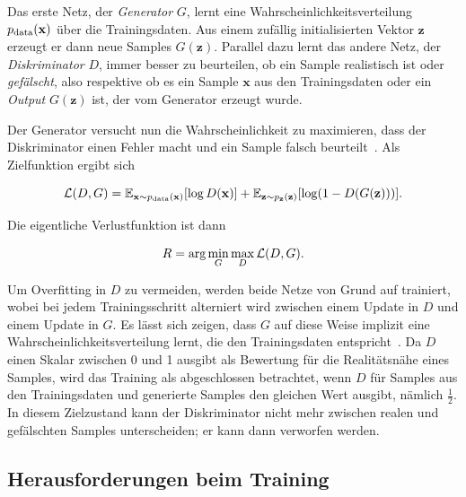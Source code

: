 Das erste Netz, der \emph{Generator} $ G $, lernt eine Wahrscheinlichkeitsverteilung $ p_{\textup{data}}(\mathbf{x}) $ über die Trainingsdaten.
Aus einem zufällig initialisierten Vektor $ \mathbf{z} $ erzeugt er dann neue Samples $ G(\mathbf{z}) $.
Parallel dazu lernt das andere Netz, der \emph{Diskriminator} $ D $, immer besser zu beurteilen, ob ein Sample realistisch ist oder \emph{gefälscht}, also respektive ob es ein Sample $ \mathbf{x} $ aus den Trainingsdaten oder ein \emph{Output} $ G(\mathbf{z}) $ ist, der vom Generator erzeugt wurde.

Der Generator versucht nun die Wahrscheinlichkeit zu maximieren, dass der Diskriminator einen Fehler macht und ein Sample falsch beurteilt~\cite{Goodfellow.2014}.
Als Zielfunktion ergibt sich

\begin{equation}\label{eq:gan}
\mathcal{L}(D, G) = \mathbb{E}_{\mathbf{x} \sim p_{\textup{data}}(\mathbf{x})} [\log D(\mathbf{x})] + \mathbb{E}_{\mathbf{z} \sim p_{\mathbf{z}}(\mathbf{z})} [\log(1 - D(G(\mathbf{z})))].
\end{equation}

Die eigentliche Verlustfunktion ist dann

\begin{equation}\label{eq:ganrisk}
R = \textup{arg}\min_G \max_D \mathcal{L}(D, G).
\end{equation}

Um Overfitting in $ D $ zu vermeiden, werden beide Netze von Grund auf trainiert, wobei bei jedem Trainingsschritt alterniert wird zwischen einem Update in $ D $ und einem Update in $ G $.
Es lässt sich zeigen, dass $ G $ auf diese Weise implizit eine Wahrscheinlichkeitsverteilung lernt, die den Trainingsdaten entspricht~\cite{Goodfellow.2014}.
Da $ D $ einen Skalar zwischen 0 und 1 ausgibt als Bewertung für die Realitätsnähe eines Samples, wird das Training als abgeschlossen betrachtet, wenn $ D $ für Samples aus den Trainingsdaten und generierte Samples den gleichen Wert ausgibt, nämlich $ \frac{1}{2} $.
In diesem Zielzustand kann der Diskriminator nicht mehr zwischen realen und gefälschten Samples unterscheiden; er kann dann verworfen werden.



\subsection{Herausforderungen beim Training}

